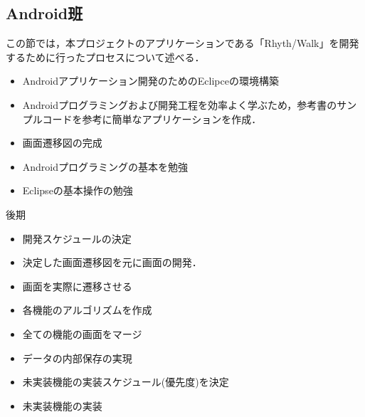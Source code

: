 \subsection{Android班}

\par この節では，本プロジェクトのアプリケーションである「Rhyth/Walk」を開発するために行ったプロセスについて述べる．
\begin{itemize}

\item Androidアプリケーション開発のためのEclipceの環境構築
\item Androidプログラミングおよび開発工程を効率よく学ぶため，参考書のサンプルコードを参考に簡単なアプリケーションを作成．
\item 画面遷移図の完成
\item Androidプログラミングの基本を勉強
\item Eclipseの基本操作の勉強
\end{itemize}

\par 後期
\begin{itemize}
\item 開発スケジュールの決定
\item 決定した画面遷移図を元に画面の開発．
\item 画面を実際に遷移させる
\item 各機能のアルゴリズムを作成
\item 全ての機能の画面をマージ
\item データの内部保存の実現
\item 未実装機能の実装スケジュール(優先度)を決定
\item 未実装機能の実装
\end{itemize}

 
